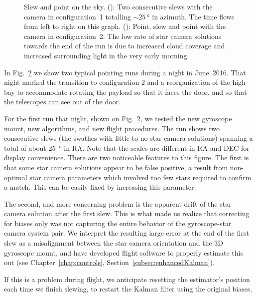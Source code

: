 \begin{landscape}
\begin{figure}[!h]
\begin{subfigure}[b]{0.7\textwidth}
		\caption{}
		\label{subfig:SlewWithStarcam2}
\end{subfigure}
\label{fig:SlewWithStarcam}
\caption[Slew and point on the sky]{Slew and point on the sky. (): Two consecutive slews with the camera in configuration~1 totalling $\sim\SI{25}{\degree}$ in azimuth. The time flows from left to right on this graph. (): Point, slew and point with the camera in configuration~2. The low rate of star camera solutions towards the end of the run is due to increased cloud coverage and increased surrounding light in the very early morning.}
\end{figure}
\end{landscape}

In Fig.~\ref{fig:SlewWithStarcam} we show two typical pointing runs during a night in June~2016. That night marked the transition to configuration 2 and a reorganization of the high bay to accommodate rotating the payload so that it faces the door, and so that the telescopes can see out of the door.

For the first run that night, shown on Fig.~\ref{fig:SlewWithStarcam}, we tested the new gyroscope mount, new algorithms, and new flight procedures. The run shows two consecutive slews (the swathes with little to no star camera solutions) spanning a total of about \SI{25}{\degree} in RA. Note that the scales are different in RA and DEC for display convenience. There are two noticeable features to this figure. The first is that some star camera solutions appear to be false positive, a result from non-optimal star camera parameters which involved too few stars required to confirm a match. This can be easily fixed by increasing this parameter.

The second, and more concerning problem is the apparent drift of the star camera solution after the first slew. This is what made us realize that correcting for biases only was not capturing the entire behavior of the gyroscope-star camera system pair. We interpret the resulting large error at the end of the first slew as a misalignment between the star camera orientation and the 3D gyroscope mount, and have developed flight software to properly estimate this out (see Chapter~\ref{chap:controls}, Section~\ref{subsec:enhancedKalman}).

If this is a problem during flight, we anticipate resetting the estimator's position each time we finish slewing, to restart the Kalman filter using the original biases.

